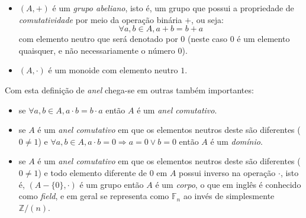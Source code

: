 \begin{itemize}
    \item $(A, +)$ é um \textit{grupo abeliano}, isto é, um grupo que possui a propriedade de \textit{comutatividade} por meio da operação binária $+$, ou seja:
    \begin{equation*}
        \forall a, b \in A, a + b = b + a
    \end{equation*}
    com elemento neutro que será denotado por $0$ (neste caso $0$ é um elemento quaisquer, e não necessariamente o número $0$).
    \item $(A, \cdot)$ é um monoide com elemento neutro $1$.
\end{itemize}
Com esta definição de \textit{anel} chega-se em outras também importantes:
\begin{itemize}
    \item se $\forall a, b \in A, a \cdot b = b \cdot a$ então $A$ é um \textit{anel comutativo}.

    \item se $A$ é um \textit{anel comutativo} em que os elementos neutros deste são diferentes ($0 \neq 1$) e $\forall a, b \in A, a \cdot b = 0 \Rightarrow a = 0 \lor b = 0$ então $A$ é um \textit{domínio}.

    \item se $A$ é um \textit{anel comutativo} em que os elementos neutros deste são diferentes ($0 \neq 1$) e todo elemento diferente de $0$ em $A$ possui inverso na operação $\cdot$, isto é, $(A - \{0\}, \cdot)$ é um grupo então $A$ é um \textit{corpo}, o que em inglês é conhecido como \textit{field}, e em geral se representa como $\mathbb{F}_n$ ao invés de simplesmente $\mathbb{Z}/(n)$.
\end{itemize}

